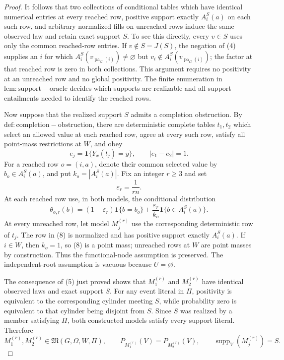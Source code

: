 \documentclass{article}
\begin{document}
\begin{proof}
It follows that two collections of conditional tables which have identical numerical entries at every reached row, positive support exactly \(A_i^S(a)\) on each such row, and arbitrary normalized fills on unreached rows induce the same observed law and retain exact support \(S\).  To see this directly, every \(v\in S\) uses only the common reached-row entries.  If \(v\notin S=J(S)\), the negation of (4) supplies an \(i\) for which \(A_i^S(v_{\operatorname{pa}_G(i)})\neq\varnothing\) but \(v_i\notin A_i^S(v_{\operatorname{pa}_G(i)})\); the factor at that reached row is zero in both collections.  This argument requires no positivity at an unreached row and no global positivity.  The finite enumeration in \(\mathrm{lem:support-oracle}\) decides which supports are realizable and all support entailments needed to identify the reached rows.

Now suppose that the realized support \(S\) admits a completion obstruction.  By \(\mathrm{def:completion-obstruction}\), there are deterministic complete tables \(t_1,t_2\) which select an allowed value at each reached row, agree at every such row, satisfy all point-mass restrictions at \(W\), and obey
\[
 e_j=\mathbf 1\{Y_x(t_j)=y\},\qquad |e_1-e_2|=1.
 \tag{6}
\]
For a reached row \(o=(i,a)\), denote their common selected value by \(b_o\in A_i^S(a)\), and put \(k_o=|A_i^S(a)|\).  Fix an integer \(r\geq3\) and set
\[
 \varepsilon_r=\frac{1}{rn}.
 \tag{7}
\]
At each reached row use, in both models, the conditional distribution
\[
 \theta_{o,r}(b)
 =(1-\varepsilon_r)\mathbf 1\{b=b_o\}
 +\frac{\varepsilon_r}{k_o}\mathbf 1\{b\in A_i^S(a)\}.
 \tag{8}
\]
At every unreached row, let model \(M_j^{(r)}\) use the corresponding deterministic row of \(t_j\).  The row in (8) is normalized and has positive support exactly \(A_i^S(a)\).  If \(i\in W\), then \(k_o=1\), so (8) is a point mass; unreached rows at \(W\) are point masses by construction.  Thus the functional-node assumption is preserved.  The independent-root assumption is vacuous because \(U=\varnothing\).

The consequence of (5) just proved shows that \(M_1^{(r)}\) and \(M_2^{(r)}\) have identical observed laws and exact support \(S\).  For any event literal in \(\Pi\), positivity is equivalent to the corresponding cylinder meeting \(S\), while probability zero is equivalent to that cylinder being disjoint from \(S\).  Since \(S\) was realized by a member satisfying \(\Pi\), both constructed models satisfy every support literal.  Therefore
\[
 M_1^{(r)},M_2^{(r)}\in\mathfrak M(G,\Omega,W,\Pi),\qquad
 P_{M_1^{(r)}}(V)=P_{M_2^{(r)}}(V),\qquad
 \operatorname{supp}_V(M_j^{(r)})=S.
 \tag{9}
\]


\end{proof}
\end{document}
